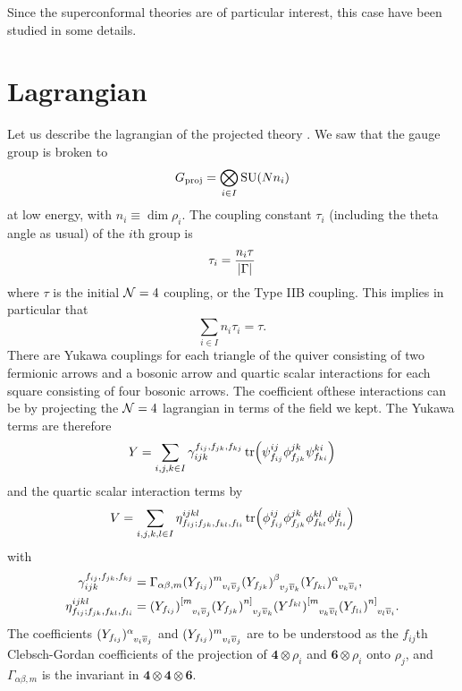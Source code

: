     Since the superconformal theories are of particular interest, this case have been studied in some details.

\section{Lagrangian}

    Let us describe the lagrangian of the projected theory \cite{vafa1998}. We saw that the gauge group is broken to 
    \begin{equation}
        G_{\text{proj}}=\bigotimes_{i\in I}\text{SU}(N n_i)
    \end{equation}
    at low energy, with $n_i\equiv\dim\rho_i$. The coupling constant $\tau_i$ (including the theta angle as usual) of the $i$th group is
    \begin{equation}
        \tau_i=\frac{n_i\tau}{\abs{\Gamma}}
    \end{equation}
    where $\tau$ is the initial $\mathcal{N}=4$ coupling, or the Type IIB coupling. This implies in particular that
    \begin{equation}
        \sum_{i\in I}n_i\tau_i=\tau.
    \end{equation}
    There are Yukawa couplings for each triangle of the quiver consisting of two fermionic arrows and a bosonic arrow and quartic scalar interactions for each square consisting of four bosonic arrows. The coefficient ofthese interactions can be by projecting the $\mathcal{N}=4$ lagrangian in terms of the field we kept. The Yukawa terms are therefore
    \begin{equation}
        Y=\sum_{i,j,k\in I}\gamma^{f_{ij},f_{jk},f_{kj}}_{ijk}\tr(\psi^{ij}_{f_{ij}}\phi^{jk}_{f_{jk}}\psi^{ki}_{f_{ki}})
    \end{equation}
    and the quartic scalar interaction terms by
    \begin{equation}
        V=\sum_{i,j,k,l\in I}\eta^{ijkl}_{f_{ij};f_{jk},f_{kl},f_{li}}\tr(\phi^{ij}_{f_{ij}}\phi^{jk}_{f_{jk}}\phi^{kl}_{f_{kl}}\phi^{li}_{f_{li}})
    \end{equation}
    with
    \begin{align}
        \gamma^{f_{ij},f_{jk},f_{kj}}_{ijk} &= \Gamma_{\alpha\beta,m}(Y_{f_{ij}})\indices{^m_{v_i\bar{v}_j}}(Y_{f_{jk}})\indices{^\beta_{v_j\bar{v}_k}}(Y_{f_{ki}})\indices{^\alpha_{v_k\bar{v}_i}}, \\
        \eta^{ijkl}_{f_{ij};f_{jk},f_{kl},f_{li}} &= (Y_{f_{ij}})\indices{^{[m}_{v_i\bar{v}_j}}(Y_{f_{jk}})\indices{^{n]}_{v_j\bar{v}_k}}(Y^{f_{kl}})\indices{^{[m}_{v_k\bar{v}_l}}(Y_{f_{li}})\indices{^{n]}_{v_l\bar{v}_i}}.
    \end{align}
    The coefficients $(Y_{f_{ij}})\indices{^\alpha_{v_i\bar{v}_j}}$ and $(Y_{f_{ij}})\indices{^m_{v_i\bar{v}_j}}$ are to be understood as the $f_{ij}$th Clebsch-Gordan coefficients of the projection of $\boldsymbol{4}\otimes\rho_i$ and $\boldsymbol{6}\otimes\rho_i$ onto $\rho_j$, and $\Gamma_{\alpha\beta,m}$ is the invariant in $\boldsymbol{4}\otimes\boldsymbol{4}\otimes\boldsymbol{6}$.

